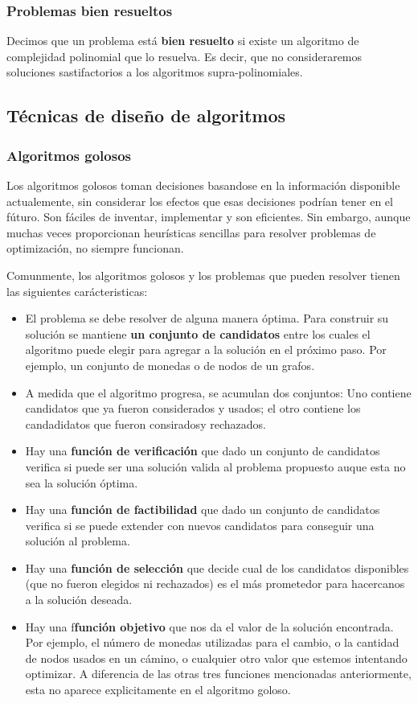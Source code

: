 \subsubsection{Problemas bien resueltos}
Decimos que un problema está \textbf{bien resuelto} si existe un algoritmo de complejidad polinomial que lo resuelva. Es decir, que no consideraremos soluciones sastifactorios a los algoritmos supra-polinomiales.

\subsection{Técnicas de diseño de algoritmos}
\subsubsection{Algoritmos golosos}
Los algoritmos golosos toman decisiones basandose en la información disponible actualemente, sin considerar los efectos que esas decisiones podrían tener en el fúturo. Son fáciles de inventar, implementar y son eficientes. Sin embargo, aunque muchas veces proporcionan heurísticas sencillas para resolver problemas de optimización, no siempre funcionan.

Comunmente, los algoritmos golosos y los problemas que pueden resolver tienen las siguientes carácteristicas:
\begin{itemize}
	\item El problema se debe resolver de alguna manera óptima. Para construir su solución se mantiene \textbf{un conjunto de candidatos} entre los cuales el algoritmo puede elegir para agregar a la solución en el próximo paso. Por ejemplo, un conjunto de monedas o de nodos de un grafos.
	\item A medida que el algoritmo progresa, se acumulan dos conjuntos: Uno contiene candidatos que ya fueron considerados y usados; el otro contiene los candadidatos que fueron consiradosy rechazados.
	\item Hay una \textbf{función de verificación} que dado un conjunto de candidatos verifica si puede ser una solución valida al problema propuesto auque esta no sea la solución óptima.
	\item Hay una \textbf{función de factibilidad} que dado un conjunto de candidatos verifica si se puede extender con nuevos candidatos para conseguir una solución al problema.
	\item Hay una \textbf{función de selección} que decide cual de los candidatos disponibles (que no fueron elegidos ni rechazados) es el más prometedor para hacercanos a la solución deseada.
	\item Hay una f\textbf{función objetivo} que nos da el valor de la solución encontrada. Por ejemplo, el número de monedas utilizadas para el cambio, o la cantidad de nodos usados en un cámino, o cualquier otro valor que estemos intentando optimizar. A diferencia de las otras tres funciones mencionadas anteriormente, esta no aparece explicitamente en el algoritmo goloso.
\end{itemize}

